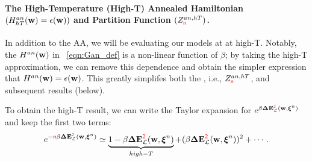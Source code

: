 \paragraph{The High-Temperature (High-T) Annealed Hamiltonian $(\HANHT(\WVEC)=\EPSLw)$ and Partition Function $(\ZANHT)$. }
In addition to the AA, we will be evaluating our models at at high-T.
Notably, the \AnnealedHamiltonian $\HAN(\WVEC)$ in \EQN~\ref{eqn:Gan_def} is a non-linear function of $\beta$; by
taking the high-T approximation, we can remove this dependence and obtain
the simpler expression that $\HAN(\WVEC)=\EPSLw$.  This greatly simplifes both
the \PartitionFunction, i.e.,  $\ZANHT$, and subsequent results (below).


To obtain the high-T result, we can write the Taylor expansion for $e^{\beta\DETOPXI}$ and keep
the first two terms:
\begin{align}
  e^{-\ND\beta\DETOPXI} \simeq \underbrace{1 - \beta\DETOPXI}_{high-T}+ (\beta\DETOPXI)^{2} + \cdots  .
\end{align}

